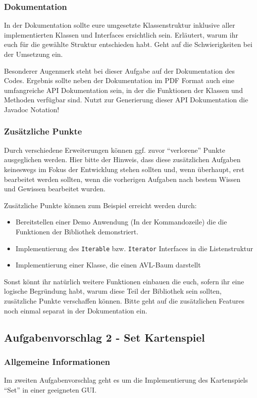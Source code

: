\documentclass[a4paper,
			   fontsize=12pt]{article}
\begin{document}
\subsubsection*{Dokumentation}
In der Dokumentation sollte eure umgesetzte Klassenstruktur inklusive aller implementierten Klassen und Interfaces ersichtlich sein. Erläutert, warum ihr euch für die
gewählte Struktur entschieden habt. Geht auf die Schwierigkeiten bei der Umsetzung ein.

Besonderer Augenmerk steht bei dieser Aufgabe auf der Dokumentation des Codes. Ergebnis sollte neben der Dokumentation im PDF Format auch eine umfangreiche API Dokumentation
sein, in der die Funktionen der Klassen und Methoden verfügbar sind. Nutzt zur Generierung dieser API Dokumentation die Javadoc Notation!

\subsubsection*{Zusätzliche Punkte}
Durch verschiedene Erweiterungen können ggf. zuvor "`verlorene"' Punkte ausgeglichen werden. Hier bitte der Hinweis, dass diese zusätzlichen Aufgaben keineswegs im Fokus der Entwicklung
stehen sollten und, wenn überhaupt, erst bearbeitet werden sollten, wenn die vorherigen Aufgaben nach bestem Wissen und Gewissen bearbeitet wurden.

Zusätzliche Punkte können zum Beispiel erreicht werden durch:
\begin{itemize}
	\item Bereitstellen einer Demo Anwendung (In der Kommandozeile) die die Funktionen der Bibliothek demonstriert.
	\item Implementierung des \texttt{Iterable} bzw. \texttt{Iterator} Interfaces in die Listenstruktur
	\item Implementierung einer Klasse, die einen AVL-Baum darstellt
\end{itemize}
Sonst könnt ihr natürlich weitere Funktionen einbauen die euch, sofern ihr eine logische Begründung habt, warum diese Teil der Bibliothek sein sollten, zusätzliche Punkte verschaffen können.
Bitte geht auf die zusätzlichen Features noch einmal separat in der Dokumentation ein.
\newpage

\subsection*{Aufgabenvorschlag 2 - Set Kartenspiel}
\subsubsection*{Allgemeine Informationen}
Im zweiten Aufgabenvorschlag geht es um die Implementierung des Kartenspiels "`Set"' in einer geeigneten GUI.
\end{document}
